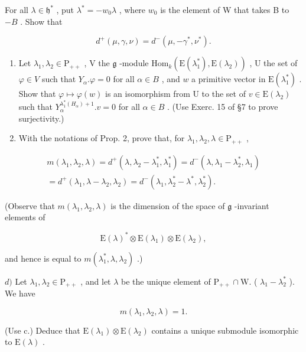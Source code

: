 For all \(\lambda \in \mathfrak{h}^*\) , put \(\lambda^{*} = -w_{0}\lambda\) , where \(w_{0}\) is the element of W that takes B to \(-B\) . Show that

\[
d ^ {+} (\mu , \gamma , \nu) = d ^ {-} (\mu , - \gamma^ {*}, \nu^ {*}).
\]

\begin{enumerate}
\def\labelenumi{\alph{enumi})}
\setcounter{enumi}{1}
\item
  Let \(\lambda_1, \lambda_2 \in \mathrm{P}_{++}\) , V the \(\mathfrak{g}\) -module \(\mathrm{Hom}_k(\mathrm{E}(\lambda_1^*), \mathrm{E}(\lambda_2))\) , U the set of \(\varphi \in V\) such that \(Y_\alpha. \varphi = 0\) for all \(\alpha \in B\) , and \(w\) a primitive vector in \(\mathrm{E}(\lambda_1^*)\) . Show that \(\varphi \mapsto \varphi(w)\) is an isomorphism from U to the set of \(v \in \mathrm{E}(\lambda_2)\) such that \(Y_\alpha^{\lambda_1^*(H_\alpha)+1}. v = 0\) for all \(\alpha \in B\) . (Use Exerc. 15 of §7 to prove surjectivity.)
\item
  With the notations of Prop. 2, prove that, for \(\lambda_1, \lambda_2, \lambda \in \mathrm{P}_{++}\) ,
\end{enumerate}

\[
\begin{array}{r} m (\lambda_ {1}, \lambda_ {2}, \lambda) = d ^ {+} (\lambda , \lambda_ {2} - \lambda_ {1} ^ {*}, \lambda_ {1} ^ {*}) = d ^ {-} (\lambda , \lambda_ {1} - \lambda_ {2} ^ {*}, \lambda_ {1}) \\ = d ^ {+} (\lambda_ {1}, \lambda - \lambda_ {2}, \lambda_ {2}) = d ^ {-} (\lambda_ {1}, \lambda_ {2} ^ {*} - \lambda^ {*}, \lambda_ {2} ^ {*}). \end{array}
\]

(Observe that \(m(\lambda_1,\lambda_2,\lambda)\) is the dimension of the space of \(\mathfrak{g}\) -invariant elements of

\[
\mathrm{E} (\lambda) ^ {*} \otimes \mathrm{E} (\lambda_ {1}) \otimes \mathrm{E} (\lambda_ {2}),
\]

and hence is equal to \(m(\lambda_1^*, \lambda, \lambda_2)\) .)

\(d)\) Let \(\lambda_1, \lambda_2 \in \mathrm{P}_{++}\) , and let \(\lambda\) be the unique element of \(\mathrm{P}_{++} \cap \mathrm{W}.\) ( \(\lambda_1 - \lambda_2^*\) ). We have

\[
m (\lambda_ {1}, \lambda_ {2}, \lambda) = 1.
\]

(Use c.) Deduce that \(\mathrm{E}(\lambda_1) \otimes \mathrm{E}(\lambda_2)\) contains a unique submodule isomorphic to \(\mathrm{E}(\lambda)\) .

